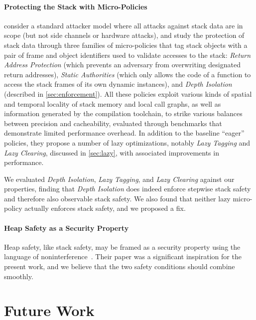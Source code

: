 \documentclass[acmsmall,review,anonymous]{acmart}\settopmatter{printfolios=true,printccs=false,printacmref=false}
\begin{document}
{\paragraph{Protecting the Stack with Micro-Policies}
%
\citet{DBLP:conf/sp/RoesslerD18} consider a standard attacker model where all
attacks against stack data are in scope (but not side channels or hardware
attacks), and study the protection of stack data through three families of
micro-policies that tag stack objects with a pair of frame and object identifiers
used to validate accesses to the stack: {\em Return Address Protection} (which
prevents an adversary from overwriting designated return addresses), {\em Static
Authorities} (which only allows the code of a function to access the stack frames
of its own dynamic instances), and {\em Depth Isolation} (described in
\cref{sec:enforcement}). All these policies exploit various kinds of spatial and
temporal locality of stack memory and local call graphs, as well as information
generated by the compilation toolchain, to strike various balances between
precision and cacheability, evaluated through benchmarks that demonstrate
limited performance overhead. In addition to the baseline ``eager'' policies,
they propose a number of lazy optimizations, notably {\em Lazy Tagging} and
{\em Lazy
Clearing}, discussed in \cref{sec:lazy}, with associated improvements in
performance.

We evaluated {\em Depth Isolation}, {\em Lazy Tagging}, and {\em Lazy
  Clearing} against our properties, finding that {\em Depth Isolation} does
indeed enforce stepwise stack safety and therefore also observable stack
safety. We also found that neither lazy micro-policy actually enforces
stack safety, and we proposed a fix.

\paragraph{Heap Safety as a Security Property}

Heap safety, like stack safety, may be framed as a security property using
the language of
noninterference~\citep{DBLP:conf/post/AmorimHP18}. Their paper was a significant inspiration
for the present work, and we believe that the two safety conditions should
combine smoothly.

\section{Future Work}
\label{sec:future}

}
\end{document}
